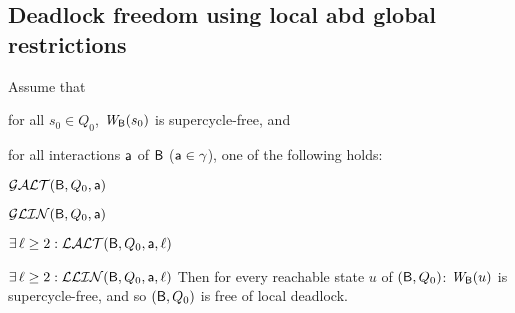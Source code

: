 











\subsection{Deadlock freedom using local abd global restrictions}


\label{theorem:local.deadlock-free}
Assume that
\bn
\item \label{theorem:local.deadlock-free.initial}
      for all $s_0 \in Q_0$, $\mathit{W}_{\mathsf{B}}({s_0})$ is supercycle-free, and
\item \label{theorem:local.deadlock-free.scfPres}
      for all interactions $\mathsf{a}$ of $\mathsf{B}$ (\ie $\mathsf{a} \in \gamma$), one of
      the following holds:
      \bn
      \item $\mathcal{GALT}(\mathsf{B},Q_0,\mathsf{a})$
      \item $\mathcal{GLIN}(\mathsf{B},Q_0,\mathsf{a})$
      \item $\exists\, \ell \ge 2: \mathcal{LALT}(\mathsf{B},Q_0,\mathsf{a},\ell)$ 
      \item $\exists\, \ell \ge 2: \mathcal{LLIN}(\mathsf{B},Q_0,\mathsf{a},\ell)$ 
      \en
\en
Then for every reachable state $u$ of $(\mathsf{B}, Q_0)$:  $\mathit{W}_{\mathsf{B}}({u})$ is supercycle-free, and so 
$(\mathsf{B}, Q_0)$ is free of local deadlock.
\et
{}

